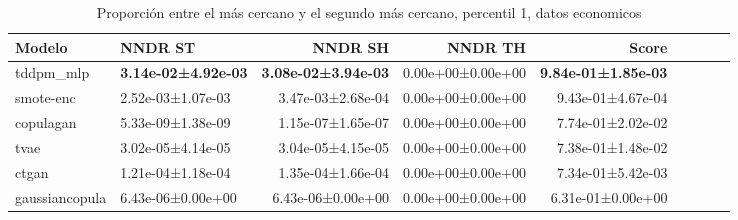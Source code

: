\begin{table}[H]
\centering
\fontsize{10}{14}\selectfont
\caption{Proporción entre el más cercano y el segundo más cercano, percentil 1, datos economicos}
\label{table-nndr-economicos-b-1th}
\begin{tabular}{|l|l|r|r|r|r|r|r|r|}
\hline
\rowcolor[gray]{0.8}
Modelo & NNDR ST & NNDR SH & NNDR TH & \textbf{Score} \\
\hline tddpm\_mlp & \bfseries 3.14e-02±4.92e-03 & \bfseries 3.08e-02±3.94e-03 & 0.00e+00±0.00e+00 & \bfseries 9.84e-01±1.85e-03 \\
\hline smote-enc & 2.52e-03±1.07e-03 & 3.47e-03±2.68e-04 & 0.00e+00±0.00e+00 & 9.43e-01±4.67e-04 \\
\hline copulagan & \cellcolor[rgb]{0.9, 0.54, 0.52} 5.33e-09±1.38e-09 & \cellcolor[rgb]{0.9, 0.54, 0.52} 1.15e-07±1.65e-07 & 0.00e+00±0.00e+00 & 7.74e-01±2.02e-02 \\
\hline tvae & 3.02e-05±4.14e-05 & 3.04e-05±4.15e-05 & 0.00e+00±0.00e+00 & 7.38e-01±1.48e-02 \\
\hline ctgan & 1.21e-04±1.18e-04 & 1.35e-04±1.66e-04 & 0.00e+00±0.00e+00 & 7.34e-01±5.42e-03 \\
\hline gaussiancopula & 6.43e-06±0.00e+00 & 6.43e-06±0.00e+00 & 0.00e+00±0.00e+00 & \cellcolor[rgb]{0.9, 0.54, 0.52} 6.31e-01±0.00e+00 \\
\hline
\end{tabular}
\end{table}
